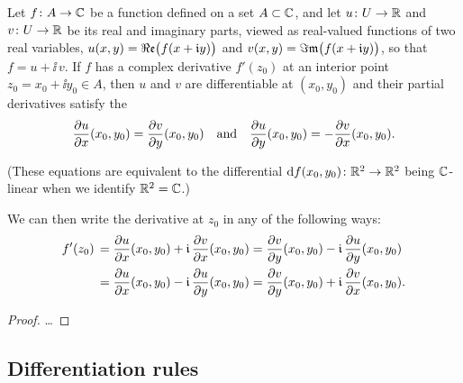 \begin{lemma}
  \label{lem:complex_derivative_implies_differentiable}
  Let $f \colon A \to \mathbb{C}$ be a function defined on a set $A \subset \mathbb{C}$,
  and let $u \colon U \to \mathbb{R}$ and $v \colon U \to \mathbb{R}$ be its
  real and imaginary parts, viewed as real-valued functions of two real variables,
  $u(x,y) = \Re\mathfrak{e} \big( f (x + \mathfrak{i} y) \big)$ and
  $v(x,y) = \Im\mathfrak{m} \big( f (x + \mathfrak{i} y) \big)$,
  so that $f = u + \ii \, v$.
  If $f$ has a complex derivative $f'(z_0)$ at an interior
  point $z_0 = x_0 + \ii y_0 \in A$, then $u$ and $v$ are differentiable
  at $(x_0,y_0)$ and their partial derivatives satisfy the
  \begin{align*}
    \frac{\partial {u}}{\partial {x}}(x_0,y_0) = \frac{\partial {v}}{\partial {y}}(x_0,y_0)
    \quad \text{and} \quad
    \frac{\partial {u}}{\partial {y}}(x_0,y_0) = - \frac{\partial {v}}{\partial {x}}(x_0,y_0).
  \end{align*}

  (These equations are equivalent to the differential
  $\mathrm{d} f (x_0, y_0) \colon \mathbb{R}^2 \to \mathbb{R}^2$
  being $\mathbb{C}$-linear when we identify $\mathbb{R}^2 = \mathbb{C}$.)

  We can then write the derivative at $z_0$ in any of the following ways:
  \begin{align*}
    f'(z_0) \, = \; & \frac{\partial {u}}{\partial {x}}(x_0,y_0) + \mathfrak{i} \, \frac{\partial {v}}{\partial {x}}(x_0,y_0)
    = \frac{\partial {v}}{\partial {y}}(x_0,y_0) - \mathfrak{i} \, \frac{\partial {u}}{\partial {y}}(x_0,y_0) \\
    = \; & \frac{\partial {u}}{\partial {x}}(x_0,y_0) - \mathfrak{i} \, \frac{\partial {u}}{\partial {y}}(x_0,y_0)
    = \frac{\partial {v}}{\partial {y}}(x_0,y_0) + \mathfrak{i} \, \frac{\partial {v}}{\partial {x}}(x_0,y_0) .
  \end{align*}

\end{lemma}
\begin{proof}
  \ldots
\end{proof}



\subsection{Differentiation rules}

